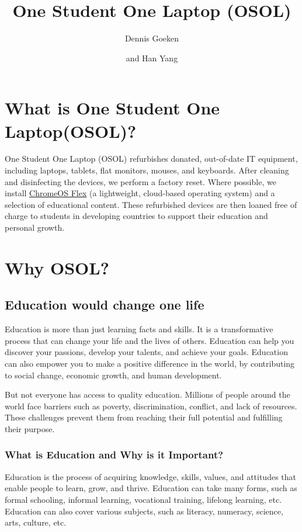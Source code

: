 \documentclass[a4paper,11pt]{article}
\title{One Student One Laptop (OSOL)}
\author{Dennis Goeken}
\author{and Han Yang}
\affiliation{IKAROS Shared Team, Riverty Group GmbH}
\begin{document}
\maketitle
\flushbottom
\listoftables
\listoffigures
\newpage

\section{What is One Student One Laptop(OSOL)?}
One Student One Laptop (OSOL) refurbishes donated, out-of-date IT equipment, including laptops, tablets, flat monitors, mouses, and keyboards. After cleaning and disinfecting the devices, we perform a factory reset. Where possible, we install  \href{https://chromeos.google/products/chromeos-flex/}{ChromeOS Flex} (a lightweight, cloud-based operating system) and a selection of educational content. These refurbished devices are then loaned free of charge to students in developing countries to support their education and personal growth.

\section{Why OSOL?}

\subsection{Education would change one life}
Education is more than just learning facts and skills. It is a transformative process that can change your life and the lives of others. Education can help you discover your passions, develop your talents, and achieve your goals. Education can also empower you to make a positive difference in the world, by contributing to social change, economic growth, and human development.

But not everyone has access to quality education. Millions of people around the world face barriers such as poverty, discrimination, conflict, and lack of resources. These challenges prevent them from reaching their full potential and fulfilling their purpose.\cite{education-change-life-world}

\subsubsection{What is Education and Why is it Important?}

Education is the process of acquiring knowledge, skills, values, and attitudes that enable people to learn, grow, and thrive. Education can take many forms, such as formal schooling, informal learning, vocational training, lifelong learning, etc. Education can also cover various subjects, such as literacy, numeracy, science, arts, culture, etc.
\end{document}
